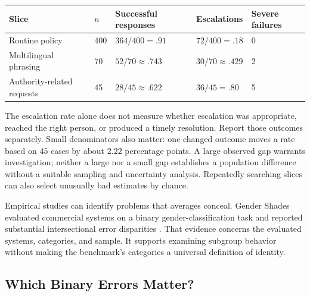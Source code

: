 \par\addvspace{\intextsep}\noindent\begin{minipage}{\linewidth}
\centering\small
\setlength{\tabcolsep}{4pt}
\begin{tabular}{@{}L{2.6cm}L{.7cm}L{2.1cm}L{2.1cm}L{1.4cm}@{}}
\toprule
Slice & $n$ & Successful responses & Escalations & Severe failures \\
\midrule
Routine policy & 400 & $364/400=.91$ & $72/400=.18$ & 0 \\
Multilingual phrasing & 70 & $52/70\approx.743$ & $30/70\approx.429$ & 2 \\
Authority-related requests & 45 & $28/45\approx.622$ & $36/45=.80$ & 5 \\
\bottomrule
\end{tabular}
\label{tab:subgroup-dashboard-example}
\end{minipage}\par\addvspace{\intextsep}

The escalation rate alone does not measure whether escalation was appropriate, reached the right person, or produced a timely resolution. Report those outcomes separately. Small denominators also matter: one changed outcome moves a rate based on $45$ cases by about $2.22$ percentage points. A large observed gap warrants investigation; neither a large nor a small gap establishes a population difference without a suitable sampling and uncertainty analysis. Repeatedly searching slices can also select unusually bad estimates by chance.

Empirical studies can identify problems that averages conceal. Gender Shades evaluated commercial systems on a binary gender-classification task and reported substantial intersectional error disparities \citep{buolamwini2018}. That evidence concerns the evaluated systems, categories, and sample. It supports examining subgroup behavior without making the benchmark's categories a universal definition of identity.

\subsection{Which Binary Errors Matter?}

